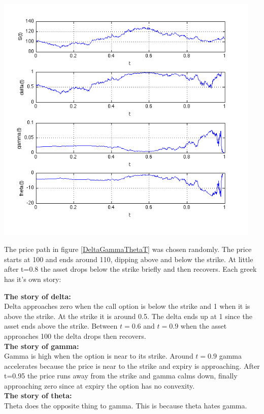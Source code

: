 \begin{center}
\includegraphics[width=5in]{pics/DeltaGammaThetaT.png}
\label{DeltaGammaThetaT}
\end{center}

The price path in figure \ref{DeltaGammaThetaT} was chosen randomly. The price starts at 100 and ends around 110, dipping above and below the strike. At little after t=0.8 the asset drops below the strike briefly and then recovers. Each greek has it's own story:


\textbf{The story of delta:}\\ Delta approaches zero when the call option is below the strike and 1 when it is above the strike. At the strike it is around 0.5.  The delta ends up at 1 since the asset ends above the strike. Between $t=0.6$ and $t=0.9$ when the asset approaches 100 the delta drops then recovers.\\
\textbf{The story of gamma:}\\ Gamma is high when the option is near to its strike. Around  $t=0.9$ gamma accelerates because the price is near to the strike and expiry is approaching. After t=0.95 the price runs away from the strike and gamma calms down, finally approaching zero since at expiry the option has no convexity.\\
\textbf{The story of theta:}\\ Theta does the opposite thing to gamma. This is because theta hates gamma.


